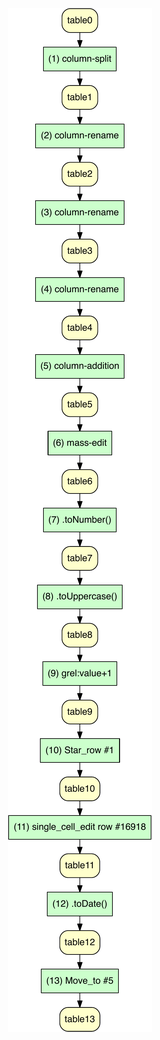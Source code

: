 \documentclass[conference]{ijdc-v14}
\begin{document}
\begin{figure}[t]
  \centering
{\includegraphics[height=0.4\textheight]{idcc2021/figures/table_view-crop.pdf}}
\hfill

\end{figure}
\end{document}
